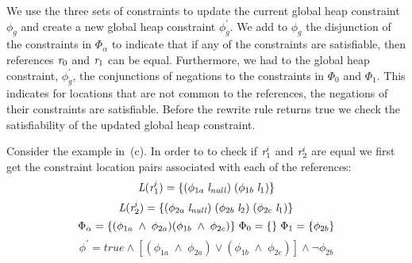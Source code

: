 We use the three sets of constraints to update the current global heap
constraint $\phi_g$ and create a new global heap constraint
$\phi_g^\prime$. We add to $\phi_g$ the disjunction of the constraints
in $\Phi_\alpha$ to indicate that if any of the constraints are
satisfiable, then references $\emph{r}_0$ and $\emph{r}_1$ can be
equal. Furthermore, we had to the global heap constraint,
$\phi_g^\prime$, the conjunctions of negations to the constraints in
$\Phi_0$ and $\Phi_1$. This indicates for locations that are not
common to the references, the negations of their constraints are
satisfiable. Before the rewrite rule returns true we check the
satisfiability of the updated global heap constraint.

Consider the example in~(c). In order to to check
if $\emph{r}_1^i$ and $\emph{r}_2^i$ are equal we first get the constraint location
pairs associated with each of the references:
\[
\emph{L}(\emph{r}_1^i) = \{ (\phi_{1a}\; \emph{l}_\mathit{null})\; (\phi_{1b}\; \emph{l}_1) \} 
\]
\[
\emph{L}(\emph{r}_2^i) = \{ (\phi_{2a}\; \emph{l}_\mathit{null})\; (\phi_{2b}\; \emph{l}_2)\; (\phi_{2c}\; \emph{l}_1) \} \\
\]
\[
\Phi_\alpha = \{ (\phi_{1a}\; \wedge\; \phi_{2a} ) (\phi_{1b}\; \wedge\; \phi_{2c} ) \}\;
\Phi_0 = \{ \}\; \Phi_1 = \{ \phi_{2b}\} \\
\]
\[
\phi^\prime = \mathit{true} \wedge [ (\phi_{1a}\; \wedge\; \phi_{2a} )\vee (\phi_{1b}\; \wedge\; \phi_{2c} ) ] \wedge \neg\phi_{2b} 
\]
